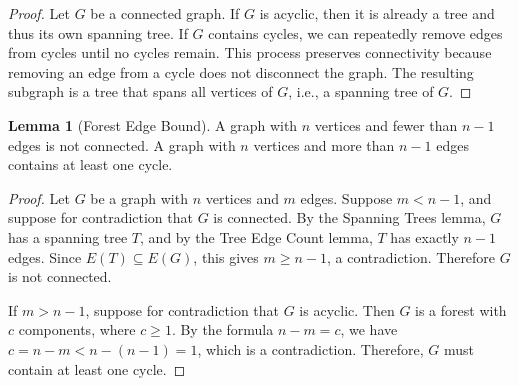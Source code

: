 \documentclass{article}
\theoremstyle{definition}
\newtheorem{lemma}{Lemma}
\begin{document}
\begin{proof}
Let $G$ be a connected graph. If $G$ is acyclic, then it is already a tree and thus its own spanning tree. If $G$ contains cycles, we can repeatedly remove edges from cycles until no cycles remain. This process preserves connectivity because removing an edge from a cycle does not disconnect the graph. The resulting subgraph is a tree that spans all vertices of $G$, i.e., a spanning tree of $G$.
\end{proof}

\begin{lemma}[Forest Edge Bound]
A graph with $n$ vertices and fewer than $n-1$ edges is not connected. A graph with $n$ vertices and more than $n-1$ edges contains at least one cycle.
\end{lemma}

\begin{proof}
Let $G$ be a graph with $n$ vertices and $m$ edges. Suppose $m < n-1$, and suppose for contradiction that $G$ is connected. By the Spanning Trees lemma, $G$ has a spanning tree $T$, and by the Tree Edge Count lemma, $T$ has exactly $n-1$ edges. Since $E(T) \subseteq E(G)$, this gives $m \geq n-1$, a contradiction. Therefore $G$ is not connected.

If $m > n-1$, suppose for contradiction that $G$ is acyclic. Then $G$ is a forest with $c$ components, where $c \geq 1$. By the formula $n - m = c$, we have $c = n - m < n - (n-1) = 1$, which is a contradiction. Therefore, $G$ must contain at least one cycle.
\end{proof}
\end{document}
